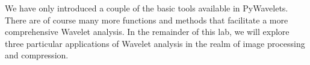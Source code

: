 We have only introduced a couple of the basic tools available in PyWavelets. There
are of course many more functions and methods that facilitate a more comprehensive
Wavelet analysis. In the remainder of this lab, we will explore three particular 
applications of Wavelet analysis in the realm of image processing and compression.

%
%

